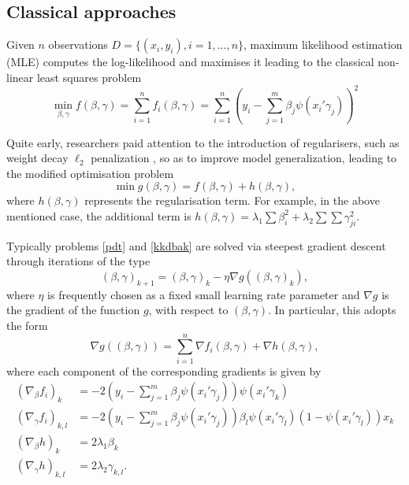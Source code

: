 \subsection{Classical approaches}\label{sanchez}

Given $n$ observations $D=\{ (x_i, y_i), i=1,...,n \}$,
 maximum likelihood estimation (MLE) 
 computes the log-likelihood and maximises it 
leading to the classical non-linear least squares problem
\begin{equation}\label{pdt}
 \min_{\beta , \gamma } f (\beta , \gamma) = \sum _{i=1}^n f_i(\beta, \gamma)  =\sum _{i=1}^n \left( y_i -
  \sum_{j=1}^m \beta_j \psi(x_i'\gamma_j) \right)^2 
 \end{equation}

\noindent Quite early, researchers paid attention to the introduction of regularisers, such as weight decay $\ell_2$ penalization \citep{krogh1992simple}, so as to improve model 
generalization, leading to the modified optimisation problem
\begin{equation}\label{kkdbak}
 \min  g(\beta ,\gamma) = f (\beta ,\gamma ) +
 h (\beta ,\gamma ), \end{equation}
where $h(\beta , \gamma )$ represents the regularisation 
term. For example, in the above mentioned case, the 
additional term is  
$h(\beta , \gamma )= \lambda _1 \sum \beta_i ^2 +
\lambda _2 \sum \sum \gamma _{ji} ^2$. 

Typically problems \ref{pdt} and \ref{kkdbak} are solved via steepest gradient descent \citep{meza} through iterations of the type
\[
   (\beta, \gamma )_{k+1}=
   (\beta, \gamma )_{k}- \eta \nabla g (  (\beta, \gamma )_{k} ),
   \]
where $\eta $ is frequently chosen as a fixed small learning rate parameter and $\nabla g $ is the gradient of the function $g$, with respect to 
$(\beta ,\gamma )$. In particular, this adopts the form 
\begin{equation}\label{gradiente1}
    \nabla g (  (\beta, \gamma )  )= \sum _{i=1}^n   \nabla f_i(\beta, \gamma) +  \nabla  h(\beta, \gamma),
    \end{equation}
    where each component of the corresponding gradients is given by 
\begin{align*}
(\nabla_\beta f_i)_k &= -2  \left(y_i - \sum_{j=1}^m \beta_j \psi(x_i' \gamma_j)\right) \psi(x_i' \gamma_k) \\
(\nabla_\gamma f_i)_{k,l} &= -2  (y_i - \sum_{j=1}^m \beta_j \psi(x_i' \gamma_j)) \beta_l \psi(x_i' \gamma_l)(1 - \psi(x_i' \gamma_l)) x_k \\
(\nabla_\beta h)_k &= 2\lambda_1 \beta_k \\
(\nabla_\gamma h)_{k,l} &= 2\lambda_2 \gamma_{k,l}.
\end{align*}

